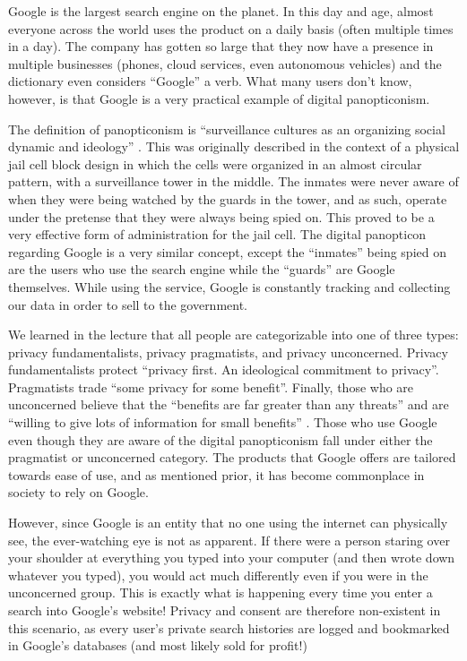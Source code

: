 \documentclass[a4paper]{article}
\begin{document}
        Google is the largest search engine on the planet. In this day and age, almost everyone 
        across the world uses the product on a daily basis (often multiple times in a day). The 
        company has gotten so large that they now have a presence in multiple businesses (phones, 
        cloud services, even autonomous vehicles) and the dictionary even considers “Google” a verb. 
        What many users don’t know, however, is that Google is a very practical example of digital 
        panopticonism. 

        The definition of panopticonism is “surveillance cultures as an organizing social 
        dynamic and ideology” \citep{lesson6}. This was originally described in the context 
        of a physical jail cell block design in which the cells were organized in an almost 
        circular pattern, with a surveillance tower in the middle. The inmates were never aware 
        of when they were being watched by the guards in the tower, and as such, operate under 
        the pretense that they were always being spied on. This proved to be a very effective 
        form of administration for the jail cell. The digital panopticon regarding Google is a 
        very similar concept, except the “inmates” being spied on are the users who use the search 
        engine while the “guards” are Google themselves. While using the service, Google is 
        constantly tracking and collecting our data in order to sell to the government. 

        We learned in the lecture that all people are categorizable into one of three types: 
        privacy fundamentalists, privacy pragmatists, and privacy unconcerned. Privacy 
        fundamentalists protect “privacy first. An ideological commitment to privacy”. Pragmatists 
        trade “some privacy for some benefit”. Finally, those who are unconcerned believe that 
        the “benefits are far greater than any threats” and are “willing to give lots of information 
        for small benefits” \citep{lesson6}. Those who use Google even though they are 
        aware of the digital panopticonism fall under either the pragmatist or unconcerned category. 
        The products that Google offers are tailored towards ease of use, and as mentioned prior, 
        it has become commonplace in society to rely on Google. 

        However, since Google is an entity that no one using the internet can physically see, 
        the ever-watching eye is not as apparent. If there were a person staring over your 
        shoulder at everything you typed into your computer (and then wrote down whatever you typed), 
        you would act much differently even if you were in the unconcerned group. 
        This is exactly what is happening every time you enter a search into Google’s website! 
        Privacy and consent are therefore non-existent in this scenario, as every user’s private 
        search histories are logged and bookmarked in Google’s databases (and most likely sold for 
        profit!)

        \pagebreak
        
        
        \cite{good2014}
        \cite{lesson4}
        \cite{lesson6}
        \cite{ong1982}
        \cite{hemo2015}
        \cite{timoti1993}
\end{document}
